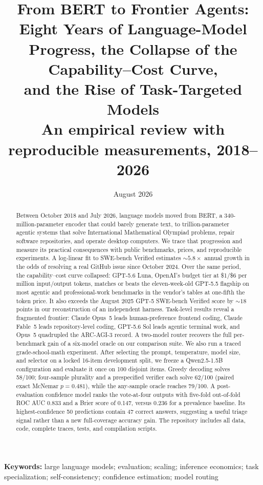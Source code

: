 \documentclass[11pt]{article}
\title{\textbf{From BERT to Frontier Agents: Eight Years of Language-Model\\Progress, the Collapse of the Capability--Cost Curve,\\and the Rise of Task-Targeted Models}\\[0.6em]
\large An empirical review with reproducible measurements, 2018--2026}
\author{}
\date{August 2026}
\begin{document}
\maketitle

\begin{abstract}
\noindent
Between October 2018 and July 2026, language models moved from BERT, a
340-million-parameter encoder that could barely generate text, to
trillion-parameter agentic systems that solve International Mathematical
Olympiad problems, repair software repositories, and operate desktop
computers. We trace that progression and measure its practical consequences
with public benchmarks, prices, and reproducible experiments. A log-linear fit
to SWE-bench Verified estimates ${\sim}5.8\times$ annual growth in the odds
of resolving a real GitHub issue since October 2024. Over the same period, the
capability--cost curve collapsed: GPT-5.6 Luna, OpenAI's budget tier at
\$1/\$6 per million input/output tokens, matches or beats the eleven-week-old
GPT-5.5 flagship on most agentic and professional-work benchmarks in the
vendor's tables at one-fifth the token price. It also exceeds the August 2025
GPT-5 SWE-bench Verified score by ${\sim}18$ points in our reconstruction of
an independent harness. Task-level results reveal a fragmented frontier:
Claude Opus~5 leads human-preference frontend coding, Claude Fable~5 leads
repository-level coding, GPT-5.6 Sol leads agentic terminal work, and Opus~5
quadrupled the ARC-AGI-3 record. A two-model router recovers the full
per-benchmark gain of a six-model oracle on our comparison suite. We also run
a traced grade-school-math experiment. After selecting the prompt, temperature,
model size, and selector on a locked 16-item development split, we freeze a
Qwen2.5-1.5B configuration and evaluate it once on 100 disjoint items. Greedy
decoding solves 58/100; four-sample plurality and a prespecified verifier each
solve 62/100 (paired exact McNemar $p=0.481$), while the any-sample oracle
reaches 79/100. A post-evaluation confidence model ranks the vote-at-four
outputs with five-fold out-of-fold ROC AUC 0.833 and a Brier score of 0.147,
versus 0.236 for a prevalence baseline. Its highest-confidence 50 predictions
contain 47 correct answers, suggesting a useful triage signal rather than a
new full-coverage accuracy gain. The repository includes all data, code,
complete traces, tests, and compilation scripts.
\end{abstract}

\vspace{0.5em}
\noindent\textbf{Keywords:} large language models; evaluation; scaling;
inference economics; task specialization; self-consistency; confidence estimation; model routing
\end{document}
